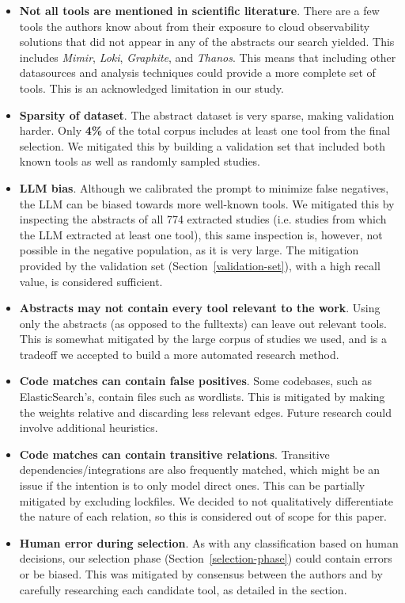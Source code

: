 \documentclass[sigconf]{acmart}
\begin{document}
\begin{itemize}
\item
  \textbf{Not all tools are mentioned in scientific literature}. There
  are a few tools the authors know about from their exposure to cloud
  observability solutions that did not appear in any of the abstracts
  our search yielded. This includes \emph{Mimir}, \emph{Loki},
  \emph{Graphite}, and \emph{Thanos}. This means that including other
  datasources and analysis techniques could provide a more complete set
  of tools. This is an acknowledged limitation in our study.
\item
  \textbf{Sparsity of dataset}. The abstract dataset is very sparse,
  making validation harder. Only \textbf{4\%} of the total corpus
  includes at least one tool from the final selection. We mitigated this
  by building a validation set that included both known tools as well as
  randomly sampled studies.
\item
  \textbf{LLM bias}. Although we calibrated the prompt to minimize false
  negatives, the LLM can be biased towards more well-known tools. We mitigated
  this by inspecting the abstracts of all 774 extracted studies (i.e. studies
  from which the LLM extracted at least one tool), this same inspection is,
  however, not possible in the negative population, as it is very large. The
  mitigation provided by the validation set (Section~\ref{validation-set}), with
  a high recall value, is considered sufficient.
\item
  \textbf{Abstracts may not contain every tool relevant to the work}.
  Using only the abstracts (as opposed to the fulltexts) can leave out
  relevant tools. This is somewhat mitigated by the large corpus of
  studies we used, and is a tradeoff we accepted to build a more
  automated research method.
\item
  \textbf{Code matches can contain false positives}. Some codebases,
  such as ElasticSearch's, contain files such as wordlists. This is
  mitigated by making the weights relative and discarding less relevant
  edges. Future research could involve additional heuristics.
\item
  \textbf{Code matches can contain transitive relations}. Transitive
  dependencies/integrations are also frequently matched, which might be
  an issue if the intention is to only model direct ones. This can be
  partially mitigated by excluding lockfiles. We decided to not
  qualitatively differentiate the nature of each relation, so this is
  considered out of scope for this paper.
\item
  \textbf{Human error during selection}. As with any classification based on
  human decisions, our selection phase (Section~\ref{selection-phase}) could
  contain errors or be biased. This was mitigated by consensus between the
  authors and by carefully researching each candidate tool, as detailed in the
  section.
\end{itemize}
\end{document}
